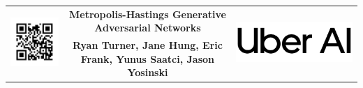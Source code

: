 \documentclass[a0,landscape]{a0poster}
\begin{document}


{
\setlength\extrarowheight{35pt}
\begin{tabular}{P{15cm}cP{15cm}}
&
{\fontsize{100}{120} \selectfont \color{NavyBlue} \textbf{Metropolis-Hastings Generative Adversarial Networks} \color{Black}}
&
 \\
&
\Huge \textbf{Ryan Turner, Jane Hung, Eric Frank, Yunus Saatci, Jason Yosinski}
&
\end{tabular}
}
%
\vspace{2cm} %

\end{document}
